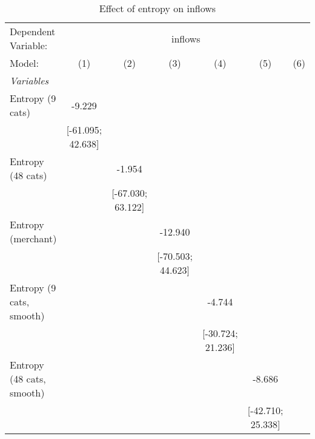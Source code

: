 
\begin{table}[htbp]
   \centering
   \tiny
   \begin{threeparttable}[b]
      \caption{\label{tab:reg_inflows} Effect of entropy on inflows}
      \begin{tabular}{lcccccc}
         \tabularnewline \midrule \midrule
         Dependent Variable: & \multicolumn{6}{c}{inflows}\\
         Model:                     & (1)                 & (2)                 & (3)                 & (4)                 & (5)                 & (6)\\  
         \midrule
         \emph{Variables}\\
         Entropy (9 cats)           & -9.229              &                     &                     &                     &                     &   \\   
                                    & [-61.095; 42.638]   &                     &                     &                     &                     &   \\   
         Entropy (48 cats)          &                     & -1.954              &                     &                     &                     &   \\   
                                    &                     & [-67.030; 63.122]   &                     &                     &                     &   \\   
         Entropy (merchant)         &                     &                     & -12.940             &                     &                     &   \\   
                                    &                     &                     & [-70.503; 44.623]   &                     &                     &   \\   
         Entropy (9 cats, smooth)   &                     &                     &                     & -4.744              &                     &   \\   
                                    &                     &                     &                     & [-30.724; 21.236]   &                     &   \\   
         Entropy (48 cats, smooth)  &                     &                     &                     &                     & -8.686              &   \\   
                                    &                     &                     &                     &                     & [-42.710; 25.338]   &   \\   

\end{tabular}
\end{threeparttable}
\end{table}
